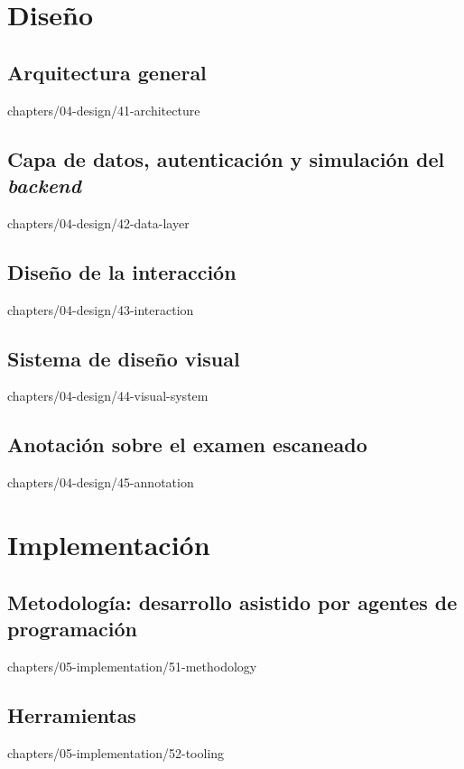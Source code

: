 \documentclass[epsbased,tfg,covers,final,printable,extendedindex,%
               firstnumbered,lof,lot,loc]{tfgtfmthesisuam}
\begin{document}
\chapter{Diseño\label{CAP:DESIGN}}
  \section{Arquitectura general\label{SEC:DES-ARCH}}%
          {chapters/04-design/41-architecture}
  \section[Capa de datos, autenticación y simulación]%
          {Capa de datos, autenticación y simulación del
           \textit{backend}\label{SEC:DES-DATA}}%
          {chapters/04-design/42-data-layer}
  \section{Diseño de la interacción\label{SEC:DES-INTERACTION}}%
          {chapters/04-design/43-interaction}
  \section{Sistema de diseño visual\label{SEC:DES-VISUAL}}%
          {chapters/04-design/44-visual-system}
  \section{Anotación sobre el examen escaneado\label{SEC:DES-ANNOTATION}}%
          {chapters/04-design/45-annotation}

\chapter{Implementación\label{CAP:IMPLEMENTATION}}
  \section[Metodología: desarrollo asistido por agentes]%
          {Metodología: desarrollo asistido por agentes de
           programación\label{SEC:IMP-METHOD}}%
          {chapters/05-implementation/51-methodology}
  \section{Herramientas\label{SEC:IMP-TOOLS}}%
          {chapters/05-implementation/52-tooling}
\end{document}
